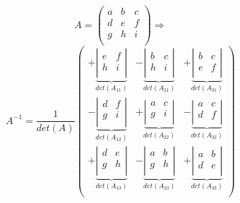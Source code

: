 \[A=\begin{pmatrix} 
	a & b & c \\
	d & e & f \\
	g & h & i \\
\end{pmatrix}  \Rightarrow \] \[A^{-1} = \frac{1}{det(A)}
\begin{pmatrix} 
	+\underbrace{\left|\begin{array}{rr} e & f \\ h & i \\ \end{array}\right|}_{det(A_{11})} &
	-\underbrace{\left|\begin{array}{rr} b & c \\ h & i \\ \end{array}\right|}_{det(A_{21})} &
	+\underbrace{\left|\begin{array}{rr} b & c \\ e & f \\ \end{array}\right|}_{det(A_{31})} \\
	
	-\underbrace{\left|\begin{array}{rr} d & f \\ g & i \\ \end{array}\right|}_{det(A_{12})} &
	+\underbrace{\left|\begin{array}{rr} a & c \\ g & i \\ \end{array}\right|}_{det(A_{22})} &
	-\underbrace{\left|\begin{array}{rr} a & c \\ d & f \\ \end{array}\right|}_{det(A_{32})} \\
	
	+\underbrace{\left|\begin{array}{rr} d & e \\ g & h \\ \end{array}\right|}_{det(A_{13})} &
	-\underbrace{\left|\begin{array}{rr} a & b \\ g & h \\ \end{array}\right|}_{det(A_{23})} &
	+\underbrace{\left|\begin{array}{rr} a & b \\ d & e \\ \end{array}\right|}_{det(A_{33})} \\
\end{pmatrix}\]

